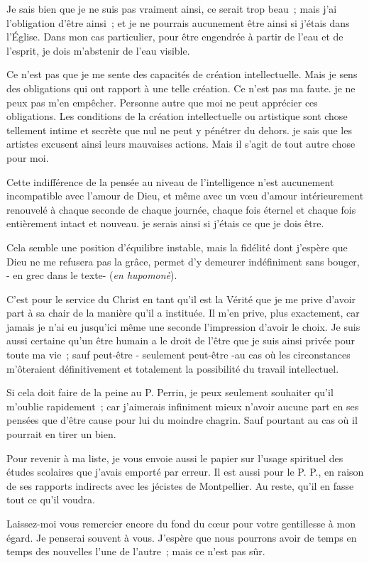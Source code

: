\documentclass[french,twoside]{book} %
\begin{document}
Je sais bien que je ne suis pas vraiment ainsi, ce serait trop beau ; mais j'ai l'obligation d'être ainsi ; et je ne pourrais aucunement être ainsi si j'étais dans l'Église. Dans mon cas particulier, pour être engendrée à partir de l'eau et de l'esprit, je dois m'abstenir de l'eau visible.\par
Ce n'est pas que je me sente des capacités de création intellectuelle. Mais je sens des obligations qui ont rapport à une telle création. Ce n'est pas ma faute. je ne peux pas m'en empêcher. Personne autre que moi ne peut apprécier ces obligations. Les conditions de la création intellectuelle ou artistique sont chose tellement intime et secrète que nul ne peut y pénétrer du dehors. je sais que les artistes excusent ainsi leurs mauvaises actions. Mais il s'agit de tout autre chose pour moi.\par
Cette indifférence de la pensée au niveau de l'intelligence n'est aucunement incompatible avec l'amour de Dieu, et même avec un vœu d'amour intérieurement renouvelé à chaque seconde de chaque journée, chaque fois éternel et chaque fois entièrement intact et nouveau. je serais ainsi si j'étais ce que je dois être.\par
Cela semble une position d'équilibre instable, mais la fidélité dont j'espère que Dieu ne me refusera pas la grâce, permet d'y demeurer indéfiniment sans bouger, - en grec dans le texte- ({\itshape en hupomonè}).\par
C'est pour le service du Christ en tant qu'il est la Vérité que je me prive d'avoir part à sa chair de la manière qu'il a instituée. Il m'en prive, plus exactement, car jamais je n'ai eu jusqu'ici même une seconde l'impression d'avoir le choix. Je suis aussi certaine qu'un être humain a le droit de l'être que je suis ainsi privée pour toute ma vie ; sauf peut-être - seulement peut-être -au cas où les circonstances m'ôteraient définitivement et totalement la possibilité du travail intellectuel.\par
Si cela doit faire de la peine au P. Perrin, je peux seulement souhaiter qu'il m'oublie rapidement ; car j'aimerais infiniment mieux n'avoir aucune part en ses pensées que d'être cause pour lui du moindre chagrin. Sauf pourtant au cas où il pourrait en tirer un bien.\par
Pour revenir à ma liste, je vous envoie aussi le papier sur l'usage spirituel des études scolaires que j'avais emporté par erreur. Il est aussi pour le P. P., en raison de ses rapports indirects avec les jécistes de Montpellier. Au reste, qu'il en fasse tout ce qu'il voudra.\par
Laissez-moi vous remercier encore du fond du cœur pour votre gentillesse à mon égard. Je penserai souvent à vous. J'espère que nous pourrons avoir de temps en temps des nouvelles l'une de l'autre ; mais ce n'est pas sûr.\par
\end{document}
